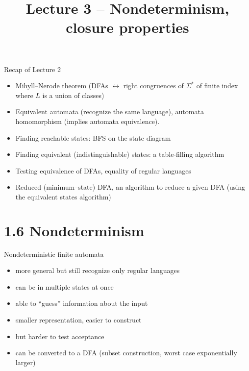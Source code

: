\documentclass[handout]{beamer}
\title{Lecture 3 -- Nondeterminism, closure properties}
\begin{document}
\frame{\titlepage}


\begin{frame}{Recap of Lecture 2}

    \begin{itemize}
        \item \alert{Mihyll–Nerode theorem} (DFAs $\leftrightarrow$ right congruences of $\Sigma^*$ of finite index where $L$ is a union of classes)
        \item Equivalent automata (recognize the same language), automata homomorphism (implies automata equivalence).
        \item Finding reachable states: BFS on the state diagram
        \item Finding equivalent (indistinguishable) states: a table-filling algorithm
        \item Testing equivalence of DFAs, equality of regular languages
        \item Reduced (minimum–state) DFA, an algorithm to reduce a given DFA (using the equivalent states algorithm)
    \end{itemize}

\end{frame}


\section{1.6 Nondeterminism}


\begin{frame}{Nondeterministic finite automata}

    \begin{itemize}
        \item more general but still recognize only regular languages
        \item can be in multiple states at once
        \item able to ``guess'' information about the input
        \item smaller representation, easier to construct
        \item but harder to test acceptance
        \item can be converted to a DFA (\alert{subset construction}, worst case exponentially larger)
    \end{itemize}

\end{frame}
\end{document}
